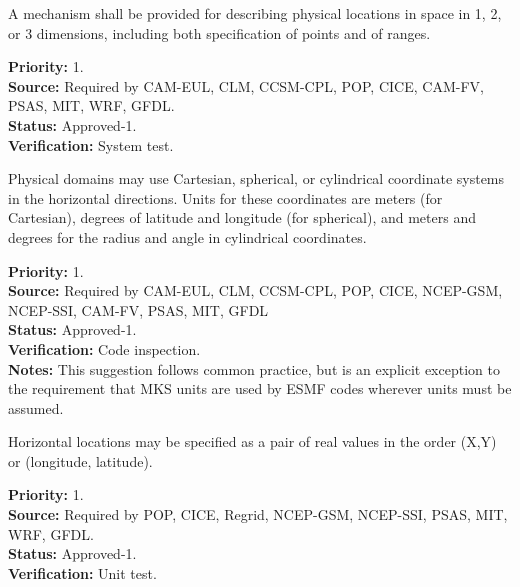 

A mechanism shall be provided for describing physical locations in space in 1,
2, or 3 dimensions, including both specification of points and of ranges.
\begin{reqlist}
{\bf Priority:} 1. \\
{\bf Source:} Required by CAM-EUL, CLM, CCSM-CPL, POP, CICE, 
              CAM-FV, PSAS, MIT, WRF, GFDL. \\
{\bf Status:} Approved-1. \\
{\bf Verification:} System test.
\end{reqlist}



Physical domains may use Cartesian, spherical, or cylindrical coordinate
systems in the horizontal directions.  Units for these coordinates are meters
(for Cartesian), degrees of latitude and longitude (for spherical), and meters
and degrees for the radius and angle in cylindrical coordinates.

\begin{reqlist}
{\bf Priority:} 1. \\
{\bf Source:} Required by CAM-EUL, CLM, CCSM-CPL, POP, CICE, NCEP-GSM, NCEP-SSI, CAM-FV, PSAS, MIT, GFDL \\
{\bf Status:} Approved-1. \\
{\bf Verification:} Code inspection.\\
{\bf Notes:}  This suggestion follows common practice, but is an explicit
exception to the requirement that MKS units are used by ESMF codes wherever
units must be assumed. 
\end{reqlist}


Horizontal locations may be specified as a pair of real values in the order
(X,Y) or (longitude, latitude).
\begin{reqlist}
{\bf Priority:} 1. \\
{\bf Source:} Required by POP, CICE, Regrid, NCEP-GSM, NCEP-SSI,
              PSAS, MIT, WRF, GFDL. \\
{\bf Status:} Approved-1. \\
{\bf Verification:} Unit test.
\end{reqlist}


